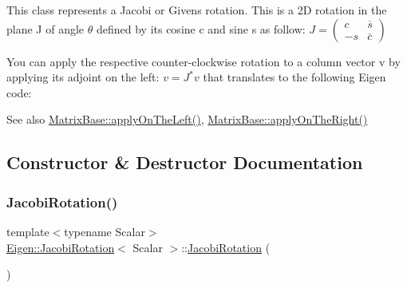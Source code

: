 This class represents a Jacobi or Givens rotation. This is a 2D rotation in the plane {\ttfamily J} of angle $ \theta $ defined by its cosine {\ttfamily c} and sine {\ttfamily s} as follow\+: $ J = \left ( \begin{array}{cc} c & \overline s \\ -s & \overline c \end{array} \right ) $

You can apply the respective counter-\/clockwise rotation to a column vector {\ttfamily v} by applying its adjoint on the left\+: $ v = J^* v $ that translates to the following Eigen code\+: 
\begin{DoxyCode}{0}
\end{DoxyCode}


\begin{DoxySeeAlso}{See also}
\mbox{\hyperlink{class_eigen_1_1_matrix_base_a3a08ad41e81d8ad4a37b5d5c7490e765}{Matrix\+Base\+::apply\+On\+The\+Left()}}, \mbox{\hyperlink{class_eigen_1_1_matrix_base_a45d91752925d2757fc8058a293b15462}{Matrix\+Base\+::apply\+On\+The\+Right()}} 
\end{DoxySeeAlso}


\subsection{Constructor \& Destructor Documentation}
\mbox{\label{class_eigen_1_1_jacobi_rotation_a38fec2c4da529ef3d05ff37b848b4227}} 
\subsubsection{\texorpdfstring{JacobiRotation()}{JacobiRotation()}\hspace{0.1cm}{\footnotesize\ttfamily [1/2]}}
{\footnotesize\ttfamily template$<$typename Scalar$>$ \\
\mbox{\hyperlink{class_eigen_1_1_jacobi_rotation}{Eigen\+::\+Jacobi\+Rotation}}$<$ Scalar $>$\+::\mbox{\hyperlink{class_eigen_1_1_jacobi_rotation}{Jacobi\+Rotation}} (\begin{DoxyParamCaption}{ }\end{DoxyParamCaption})\hspace{0.3cm}{\ttfamily [inline]}}

